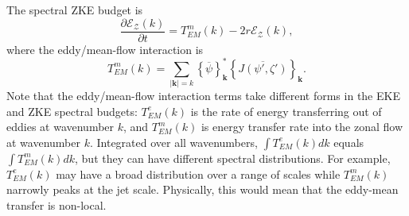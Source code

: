 \documentclass{jfm}
\begin{document}
The spectral ZKE budget is
\begin{equation}
\frac{\partial\mathcal{E}_{\mathcal{Z}}(k)}{\partial t}=T_{EM}^{m}(k)-2r\mathcal{E}_{\mathcal{Z}}(k),\label{eq:spectral_ZKE_budget}
\end{equation}
where the eddy/mean-flow interaction is
\begin{equation}
T_{EM}^{m}(k)=\underset{|\mathbf{k}|=k}{\sum}\left\{ \overline{\psi}\right\} _{\mathbf{k}}^{*}\left\{ \overline{J(\psi',\zeta')}\right\} _{\mathbf{k}}.
\end{equation}
Note that the eddy/mean-flow interaction terms take different forms in the EKE
and ZKE spectral budgets: $T_{EM}^{e}(k)$ is the rate of energy
transferring out of eddies at wavenumber $k$, and $T_{EM}^{m}(k)$ is
energy transfer rate into the zonal flow at wavenumber $k$. Integrated
over all wavenumbers, $\int T_{EM}^{e}(k)dk$ equals $\int T_{EM}^{m}(k)dk$, but they can have different
spectral distributions. For example, $T_{EM}^{e}(k)$ may have a broad distribution over a range
of scales while $T_{EM}^{m}(k)$ narrowly peaks at the jet scale.
Physically, this would mean that the eddy-mean transfer is non-local.
\end{document}
